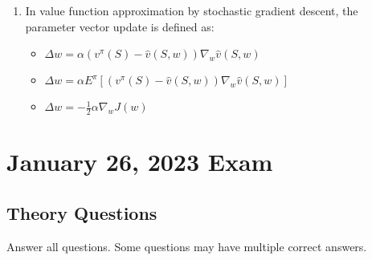 \documentclass[openany]{book}
\theoremstyle{definition}
\theoremstyle{remark}
\begin{document}
\begin{enumerate}
    \item In value function approximation by stochastic gradient descent, the parameter vector update is defined as:
    \begin{itemize}
        \item[\checkmark] $\Delta w = \alpha(v^\pi(S) - \hat{v}(S,w))\nabla_w \hat{v}(S,w)$
        \item[] $\Delta w = \alpha E^\pi[(v^\pi(S) - \hat{v}(S,w))\nabla_w \hat{v}(S,w)]$
        \item[] $\Delta w = -\frac{1}{2}\alpha\nabla_w J(w)$
    \end{itemize}
\end{enumerate}


\chapter{January 26, 2023 Exam}

\section*{Theory Questions}
Answer all questions. Some questions may have multiple correct answers.
\end{document}
